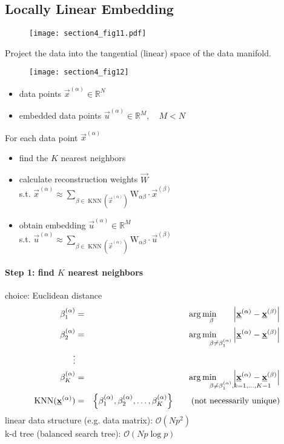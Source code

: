 \subsection{Locally Linear Embedding}
\begin{figure}[h]
	\centering
	\texttt{[image: section4\_fig11.pdf]}
\end{figure}
Project the data into the tangential (linear) space of the data manifold.
\begin{wrapfigure}{r}{0.5\textwidth}
  \begin{center}
    \texttt{[image: section4\_fig12]}
  \end{center}
\end{wrapfigure}
\vspace{-0.2cm}
\begin{itemize}
	\item data points  $\vec{x}^{(\alpha)} \in \mathbb{R}^N$
	\item embedded data points  $\vec{u}^{(\alpha)} \in \mathbb{R}^M, \quad M < N$
\end{itemize}
\small For each data point $\vec{x}^{(\alpha)}$
\begin{itemize}
	\item find the $K$ nearest neighbors
	\item calculate reconstruction weights $\vec{W}$\\ s.t. $\vec{x}^{(\alpha)} \approx \sum_{\beta \in \operatorname{KNN}(\vec{x}^{(\alpha)})}^{} \mathrm{W}_{\alpha \beta} \cdot \vec{x}^{(\beta)}$
	\item obtain embedding $\vec{u}^{(\alpha)} \in \mathbb{R}^M$\\ s.t. $\vec{u}^{(\alpha)} \approx \sum_{\beta \in \operatorname{KNN}(\vec{x}^{(\alpha)})}^{} \mathrm{W}_{\alpha \beta} \cdot \vec{u}^{(\beta)}$
\end{itemize}

\paragraph{Step 1: find $K$ nearest neighbors}
choice: Euclidean distance
\begin{eqnarray*}
	\beta_1^{(\alpha)} &=& \arg \min_{\mathrlap{\beta}} \qquad \abs{\vec{x}^{(\alpha)} - \vec{x}^{(\beta)}} \\
	\beta_2^{(\alpha)} &=& \arg \min_{\mathrlap{\beta \neq \beta_1^{(\alpha)}}} \qquad \abs{\vec{x}^{(\alpha)} - \vec{x}^{(\beta)}} \\
	\vdots &&\\
	\beta_K^{(\alpha)} &=& \arg \min_{\mathrlap{\beta \neq \beta_1^{(\alpha)},k=1, \dots, K-1}} \qquad \abs{\vec{x}^{(\alpha)} - \vec{x}^{(\beta)}}\\
	\operatorname{KNN}(\vec{x}^{(\alpha)}) &=& \left\{ \beta_1^{(\alpha)}, \beta_2^{(\alpha)}, \dots, \beta_K^{(\alpha)}  \right\} \qquad \text{(not necessarily unique)}
\end{eqnarray*}
linear data structure (e.g. data matrix): \quad $\mathcal{O}(Np^2)$\\
k-d tree (balanced search tree): \hspace{1.55cm} $\mathcal{O}(Np \log p)$
\newcommand\mydots{\hbox to 1em{.\hss.\hss.}}
